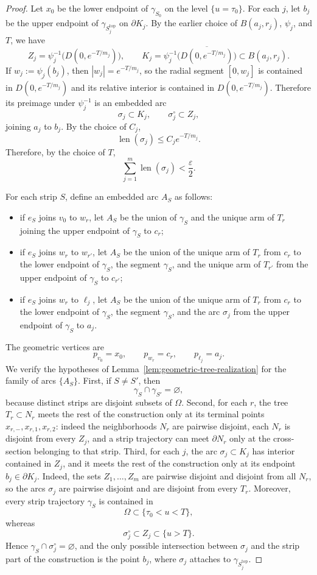 \documentclass[12pt]{amsart}
\theoremstyle{definition}
\theoremstyle{remark}
\begin{document}
\begin{proof}
Let \(x_0\) be the lower endpoint of \(\gamma_{S_0}\) on the level \(\{u=\tau_0\}\). For each \(j\), let \(b_j\) be the upper endpoint of \(\gamma_{S_j^{\mathrm{top}}}\) on \(\partial K_j\). By the earlier choice of $B(a_j,r_j)$, $\psi_j$, and $T$, we have
\[
Z_j=\psi_j^{-1}\bigl(D(0,e^{-T/m_j})\bigr),
\qquad
K_j=\psi_j^{-1}\bigl(\overline{D(0,e^{-T/m_j})}\bigr)\subset B(a_j,r_j).
\]
If $w_j:=\psi_j(b_j)$, then $|w_j|=e^{-T/m_j}$, so the radial segment $[0,w_j]$
is contained in $\overline{D(0,e^{-T/m_j})}$ and its relative interior is contained in
$D(0,e^{-T/m_j})$. Therefore its preimage under $\psi_j^{-1}$ is an embedded arc
\[
\sigma_j\subset K_j,\qquad \sigma_j^\circ\subset Z_j,
\]
joining $a_j$ to $b_j$. By the choice of $C_j$,
\[
\operatorname{len}(\sigma_j)\le C_j e^{-T/m_j}.
\]
Therefore, by the choice of $T$,
\[
\sum_{j=1}^m \operatorname{len}(\sigma_j)<\frac{\varepsilon}{2}. \tag{13}
\]

\indent For each strip $S$, define an embedded arc $A_S$ as follows:
\begin{itemize}
\item if $e_S$ joins $v_0$ to $w_r$, let $A_S$ be the union of $\gamma_S$ and the unique arm of $T_r$ joining the upper
      endpoint of $\gamma_S$ to $c_r$;
\item if $e_S$ joins $w_r$ to $w_{r'}$, let $A_S$ be the union of the unique arm of $T_r$ from $c_r$ to the lower endpoint
      of $\gamma_S$, the segment $\gamma_S$, and the unique arm of $T_{r'}$ from the upper endpoint of $\gamma_S$ to $c_{r'}$;
\item if $e_S$ joins $w_r$ to $\ell_j$, let $A_S$ be the union of the unique arm of $T_r$ from $c_r$ to the lower endpoint
      of $\gamma_S$, the segment $\gamma_S$, and the arc $\sigma_j$ from the upper endpoint of $\gamma_S$ to $a_j$.
\end{itemize}
The geometric vertices are
\[
 p_{v_0}=x_0,\qquad p_{w_r}=c_r,\qquad p_{\ell_j}=a_j.
\]
We verify the hypotheses of Lemma~\ref{lem:geometric-tree-realization} for the family of arcs $\{A_S\}$. First, if $S\neq S'$, then
\[
\gamma_S\cap\gamma_{S'}=\varnothing,
\]
because distinct strips are disjoint subsets of $\Omega$. Second, for each $r$, the tree $T_r\subset N_r$ meets the rest of the construction only at its terminal points $x_{r,-},x_{r,1},x_{r,2}$: indeed the neighborhoods $N_r$ are pairwise disjoint, each $N_r$ is disjoint from every $Z_j$, and a strip trajectory can meet $\partial N_r$ only at the cross-section belonging to that strip. Third, for each $j$, the arc $\sigma_j\subset K_j$ has interior contained in $Z_j$, and it meets the rest of the construction only at its endpoint $b_j\in\partial K_j$. Indeed, the sets $Z_1,\dots,Z_m$ are pairwise disjoint and disjoint from all $N_r$, so the arcs $\sigma_j$ are pairwise disjoint and are disjoint from every $T_r$. Moreover, every strip trajectory $\gamma_S$ is contained in
\[
\Omega\subset\{\tau_0<u<T\},
\]
whereas
\[
\sigma_j^\circ\subset Z_j\subset\{u>T\}.
\]
Hence $\gamma_S\cap \sigma_j^\circ=\varnothing$, and the only possible intersection between $\sigma_j$ and the strip part of the construction is the point $b_j$, where $\sigma_j$ attaches to $\gamma_{S_j^{\mathrm{top}}}$.


\end{proof}
\end{document}
